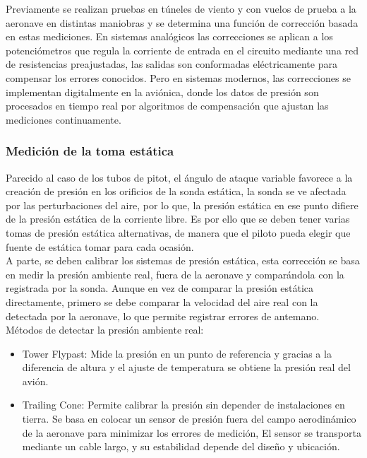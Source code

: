 Previamente se realizan pruebas en túneles de viento y con vuelos de prueba a la aeronave en distintas maniobras y se  determina una función de corrección basada en estas mediciones. En sistemas analógicos las correcciones se aplican a los potenciómetros que regula la corriente de entrada en el circuito mediante una red de resistencias preajustadas, las salidas son conformadas eléctricamente para compensar los errores conocidos.  Pero en sistemas modernos, las correcciones se implementan digitalmente en la aviónica, donde los datos de presión son procesados en tiempo real por algoritmos de compensación que ajustan las mediciones continuamente.\\


\subsubsection{Medición de la toma estática}
Parecido al caso de los tubos de pitot, el ángulo de ataque variable favorece a la creación de presión en los orificios de la sonda estática, la sonda se ve afectada por las perturbaciones del aire, por lo que, la presión estática en ese punto difiere de la presión estática de la corriente libre. Es por ello que se deben tener varias tomas de presión estática alternativas, de manera que el piloto pueda elegir que fuente de estática tomar para cada ocasión.\\

A parte, se deben calibrar los sistemas de presión estática, esta corrección se basa en medir la presión ambiente real, fuera de la aeronave y comparándola con la registrada por la sonda. Aunque en vez de comparar la presión estática directamente, primero se debe comparar la velocidad del aire real con la detectada por la aeronave, lo que permite registrar errores de antemano.\\

Métodos de detectar la presión ambiente real:
\begin{itemize}
\item Tower Flypast: Mide la presión en un punto de referencia y gracias a la diferencia de altura y el ajuste de temperatura se obtiene la presión real del avión.
\item Trailing Cone: Permite calibrar la presión sin depender de instalaciones en tierra. Se basa en colocar un sensor de presión fuera del campo aerodinámico de la aeronave para minimizar los errores de medición, El sensor se transporta mediante un cable largo, y su estabilidad depende del diseño y ubicación.\\
\end{itemize}

